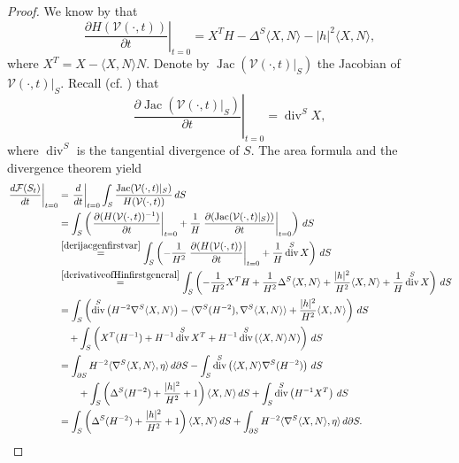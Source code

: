 \documentclass[11pt]{amsart}
\newcommand{\F}{\mathcal F}
\DeclareMathOperator{\divv}{div}
\DeclareMathOperator{\jac}{Jac}
\theoremstyle{definition}
\theoremstyle{remark}
\numberwithin{equation}{section}
\begin{document}
	\begin{proof}
		We know by \cite[Lemma 1.26]{MR4676392} that 
		\begin{equation}\label{derivativeofHinfirstgeneral}
			\left. \frac{\partial H(\mathcal V(\cdot,t))}{\partial t}\right|_{t=0}=X^TH-\Delta^S\langle X,N\rangle-|h|^2\langle X,N\rangle,
		\end{equation}
		where $X^T=X-\langle X,N\rangle N$. Denote by $\jac(\mathcal V(\cdot,t)|_S)$ the Jacobian of $\mathcal V(\cdot,t)|_S$. Recall (cf. \cite{MR4676392}) that 
		\begin{equation}\label{derijacgenfirstvar}
			\left. \frac{\partial \jac(\mathcal V(\cdot,t)|_S)}{\partial t}\right|_{t=0}=\divv^S X,
		\end{equation}
		where $\divv ^S$ is the tangential divergence of $S$.
		The area formula and the divergence theorem yield
		\begin{equation*}
			\begin{split}
				\left.\frac{d\F(S_t)}{dt}\right|_{t=0}&= \left.\frac{d}{dt}\right|_{t=0}\int_S\frac{\jac(\mathcal V(\cdot,t)|_S)}{H(\mathcal V(\cdot,t))}\,dS\\
				&=\int_S\left(\left.\frac{\partial(H(\mathcal V(\cdot,t))^{-1})}{\partial t}\right|_{t=0}+\frac{1}{H}\left.\frac{\partial (\jac(\mathcal V(\cdot,t)|_S))}{\partial t}\right|_{t=0}\right)\,dS\\
				&\overset{\eqref{derijacgenfirstvar}}{=}
				\int_S\left(-\frac{1}{H^2}\left.\frac{\partial(H(\mathcal V(\cdot,t))}{\partial t}\right|_{t=0}+\frac{1}{H}\divv^S X\right)\,dS\\
				&\overset{\eqref{derivativeofHinfirstgeneral}}{=}
				\int_S\left(-\frac{1}{H^2}X^TH+\frac{1}{H^2}\Delta^S\langle X,N\rangle+\frac{|h|^2}{H^2}\langle X,N\rangle+\frac{1}{H}\divv^S X\right)\,dS\\
				&=
				\int_S\left(\divv^S\left(H^{-2}\nabla^S\langle X,N\rangle\right)-\langle\nabla^S(H^{-2}),\nabla^S\langle X,N\rangle\rangle+\frac{|h|^2}{H^2}\langle X,N\rangle\right)\,dS\\
				&\quad+
				\int_S\left(X^T(H^{-1})+H^{-1}\divv^S X^T+H^{-1}\divv^S \left(\langle X,N\rangle N\right)\right)\,dS\\
				&=
				\int_{\partial S}H^{-2}\langle\nabla^S\langle X,N\rangle,\eta\rangle\,d\partial S-\int_S\divv^S\left(\langle X,N\rangle\nabla^S(H^{-2})\right)\,dS\\
				&\qquad+\int_S\left(\Delta^S(H^{-2})+\frac{|h|^2}{H^2}+1\right)\langle X,N\rangle\,dS+\int_S\divv^S\left(H^{-1}X^T\right)\,dS\\
				&=\int_S\left(\Delta^S(H^{-2})+\frac{|h|^2}{H^2}+1\right)\langle X,N\rangle\,dS+ \int_{\partial S}H^{-2}\langle\nabla^S\langle X,N\rangle,\eta\rangle\,d\partial S. \qedhere
			\end{split}
		\end{equation*}
	\end{proof}
	
\end{document}
